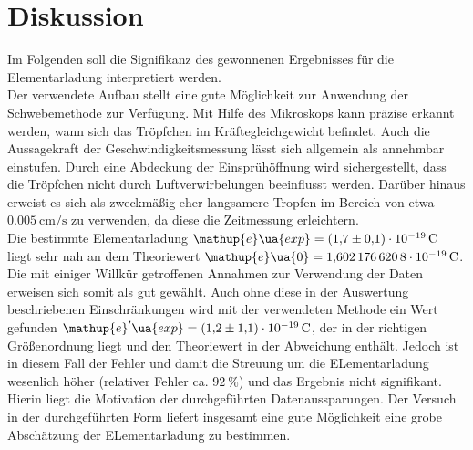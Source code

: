 \section{Diskussion}
Im Folgenden soll die Signifikanz des gewonnenen Ergebnisses für die Elementarladung interpretiert werden. \\
Der verwendete Aufbau stellt eine gute Möglichkeit zur Anwendung der Schwebemethode zur Verfügung. Mit Hilfe des Mikroskops
kann präzise erkannt werden, wann sich das Tröpfchen im Kräftegleichgewicht befindet. Auch die Aussagekraft der Geschwindigkeitsmessung lässt
sich allgemein als annehmbar einstufen. Durch eine Abdeckung der Einsprühöffnung wird sichergestellt, dass die
Tröpfchen nicht durch Luftverwirbelungen beeinflusst werden. Darüber hinaus erweist es sich als zweckmäßig eher langsamere Tropfen
im Bereich von etwa $\SI{0.005}{\centi\meter \per \second}$ zu verwenden, da diese die Zeitmessung erleichtern. \\
Die bestimmte Elementarladung $\mathup{e}\ua{exp} = \SI{+1.7(1)e-19}{\coulomb}$ liegt sehr nah an dem Theoriewert
$\mathup{e}\ua{0} = \SI{1.6021766208e-19}{\coulomb}$. Die mit einiger Willkür getroffenen Annahmen zur Verwendung der Daten erweisen sich
somit als gut gewählt. Auch ohne diese in der Auswertung beschriebenen Einschränkungen wird mit der verwendeten Methode ein Wert gefunden
$\mathup{e}'\ua{exp} = \SI{+1.2(11)e-19}{\coulomb}$, der in der richtigen Größenordnung liegt und den Theoriewert in der Abweichung enthält. Jedoch ist in
diesem Fall der Fehler und damit die Streuung um die ELementarladung wesenlich höher (relativer Fehler ca. $\SI{92}{\percent}$) und das Ergebnis
nicht signifikant. Hierin liegt die Motivation der durchgeführten Datenaussparungen.
Der Versuch in der durchgeführten Form liefert insgesamt eine gute Möglichkeit eine grobe Abschätzung der ELementarladung zu bestimmen.

